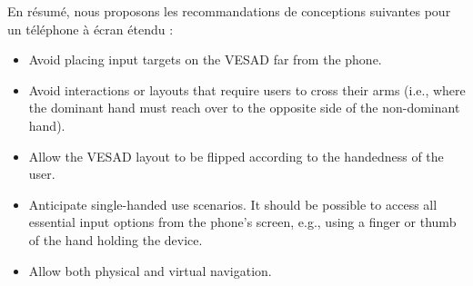 

En résumé, nous proposons les recommandations de conceptions suivantes pour un téléphone à écran étendu :
\begin{itemize}
  \item Avoid placing input targets on the VESAD far from the phone.
  \item Avoid interactions or layouts that require users to cross their arms (i.e., where the dominant hand must reach over to the opposite side of the non-dominant hand).
  \item Allow the VESAD layout to be flipped according to the handedness of the user.
  \item Anticipate single-handed use scenarios. It should be possible to access all essential input options from the phone's screen, e.g., using a finger or thumb of the hand holding the device.
  \item Allow both physical and virtual navigation.
\end{itemize}




